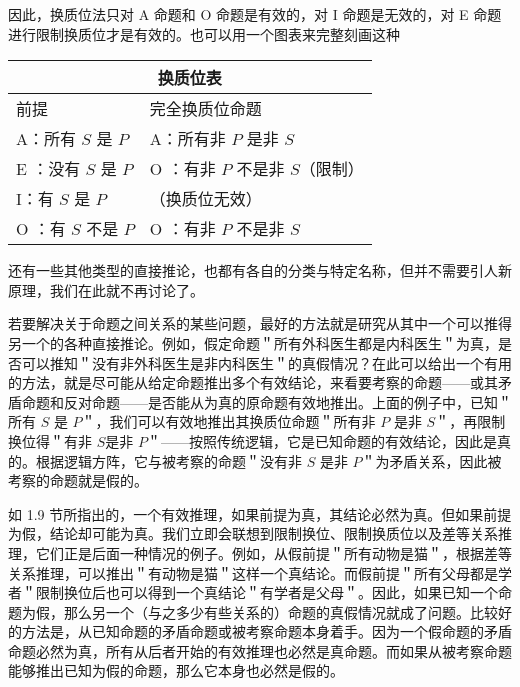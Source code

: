 因此，换质位法只对 A 命题和 O 命题是有效的，对 I 命题是无效的，对 E 命题进行限制换质位才是有效的。也可以用一个图表来完整刻画这种

\begin{center}
\begin{tabular}{|l|l|}
\hline
\multicolumn{2}{|c|}{换质位表} \\
\hline
前提 & 完全换质位命题 \\
\hline
A：所有 $S$ 是 $P$ & A：所有非 $P$ 是非 $S$ \\
\hline
E ：没有 $S$ 是 $P$ & O ：有非 $P$ 不是非 $S$（限制） \\
\hline
I：有 $S$ 是 $P$ & （换质位无效） \\
\hline
O ：有 $S$ 不是 $P$ & O ：有非 $P$ 不是非 $S$ \\
\hline
\end{tabular}
\end{center}

还有一些其他类型的直接推论，也都有各自的分类与特定名称，但并不需要引人新原理，我们在此就不再讨论了。

若要解决关于命题之间关系的某些问题，最好的方法就是研究从其中一个可以推得另一个的各种直接推论。例如，假定命题＂所有外科医生都是内科医生＂为真，是否可以推知＂没有非外科医生是非内科医生＂的真假情况？在此可以给出一个有用的方法，就是尽可能从给定命题推出多个有效结论，来看要考察的命题——或其矛盾命题和反对命题——是否能从为真的原命题有效地推出。上面的例子中，已知＂所有 $S$ 是 $P$＂，我们可以有效地推出其换质位命题＂所有非 $P$ 是非 $S$＂，再限制换位得＂有非 $S$是非 $P$＂——按照传统逻辑，它是已知命题的有效结论，因此是真的。根据逻辑方阵，它与被考察的命题＂没有非 $S$ 是非 $P$＂为矛盾关系，因此被考察的命题就是假的。

如 1.9 节所指出的，一个有效推理，如果前提为真，其结论必然为真。但如果前提为假，结论却可能为真。我们立即会联想到限制换位、限制换质位以及差等关系推理，它们正是后面一种情况的例子。例如，从假前提＂所有动物是猫＂，根据差等关系推理，可以推出＂有动物是猫＂这样一个真结论。而假前提＂所有父母都是学者＂限制换位后也可以得到一个真结论＂有学者是父母＂。因此，如果已知一个命题为假，那么另一个（与之多少有些关系的）命题的真假情况就成了问题。比较好的方法是，从已知命题的矛盾命题或被考察命题本身着手。因为一个假命题的矛盾命题必然为真，所有从后者开始的有效推理也必然是真命题。而如果从被考察命题能够推出已知为假的命题，那么它本身也必然是假的。

